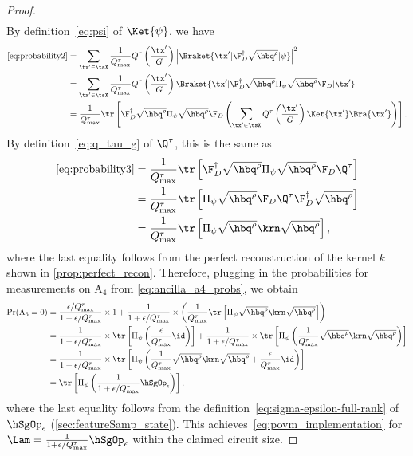 \begin{proof}
\begin{align}
  \end{align}
  By definition~\cref{eq:psi} of $\Ket{\psi}$, we have
  \begin{align}
    \label{eq:probability3}\cref{eq:probability2}&=\sum_{\tx'\in\tsX}\frac{1}{Q_{\max}^{\tau}}Q^{\tau}\left(\frac{\tx'}{G}\right){\left|\Braket{\tx'|\F_{D}^\dag\sqrt{\hbq^{\rho}}|\psi}\right|}^2\nonumber\\
    &=\sum_{\tx'\in\tsX}\frac{1}{Q_{\max}^{\tau}}Q^{\tau}\left(\frac{\tx'}{G}\right)\Braket{\tx'|\F_{D}^\dag\sqrt{\hbq^{\rho}}\Pi_{\psi}\sqrt{\hbq^{\rho}}\F_{D}|\tx'}\nonumber\\
    &=\frac{1}{Q_{\max}^{\tau}}\tr\left[\F_{D}^\dag\sqrt{\hbq^{\rho}}\Pi_{\psi}\sqrt{\hbq^{\rho}}\F_{D}\left(\sum_{\tx'\in\tsX}Q^{\tau}\left(\frac{\tx'}{G}\right)\Ket{\tx'}\Bra{\tx'}\right)\right].
  \end{align}
  By definition~\cref{eq:q_tau_g} of $\Q^{\tau}$, this is the same as
  \begin{align}
    \label{eq:probability4}\cref{eq:probability3}&=\frac{1}{Q_{\max}^{\tau}}\tr\left[\F_{D}^\dag\sqrt{\hbq^{\rho}}\Pi_{\psi}\sqrt{\hbq^{\rho}}\F_{D} \Q^{\tau}\right]\nonumber\\
    &=\frac{1}{Q_{\max}^{\tau}}\tr\left[\Pi_{\psi}\sqrt{\hbq^{\rho}}\F_{D} \Q^{\tau}\F_{D}^\dag\sqrt{\hbq^{\rho}}\right]\nonumber\\
    &=\frac{1}{Q_{\max}^{\tau}}\tr\left[\Pi_{\psi}\sqrt{\hbq^{\rho}}\krn\sqrt{\hbq^{\rho}}\right],
  \end{align}
  where the last equality follows from the perfect reconstruction of the kernel $k$ shown in \cref{prop:perfect_recon}.
  Therefore, plugging in the probabilities for measurements on A$_4$ from \cref{eq:ancilla_a4_probs}, we obtain
  \begin{align}
    \Pr(\text{A}_5=0)&=\frac{\epsilon/Q_{\max}^{\tau}}{1+\epsilon/Q_{\max}^{\tau}}\times 1+\frac{1}{1+\epsilon/Q_{\max}^{\tau}}\times\left(\frac{1}{Q_{\max}^{\tau}}\tr\left[\Pi_{\psi}\sqrt{\hbq^{\rho}}\krn\sqrt{\hbq^{\rho}}\right]\right)\nonumber\\
    &=\frac{1}{1+\epsilon/Q_{\max}^{\tau}}\times \tr\left[\Pi_{\psi}\left(\frac{\epsilon}{Q_{\max}^{\tau}}\id\right)\right]+\frac{1}{1+\epsilon/Q_{\max}^{\tau}}\times\tr\left[\Pi_{\psi}\left(\frac{1}{Q_{\max}^{\tau}}\sqrt{\hbq^{\rho}}\krn\sqrt{\hbq^{\rho}}\right)\right]\nonumber\\
    &=\frac{1}{1+\epsilon/Q_{\max}^{\tau}}\times \tr\left[\Pi_{\psi}\left(\frac{1}{Q_{\max}^{\tau}}\sqrt{\hbq^{\rho}}\krn\sqrt{\hbq^{\rho}}+\frac{\epsilon}{Q_{\max}^{\tau}}\id\right)\right]\nonumber\\
    &=\tr\left[\Pi_{\psi}\left(\frac{1}{1+\epsilon/Q_{\max}^{\tau}}\hSgOp_\epsilon\right)\right],
  \end{align}
  where the last equality follows from the definition~\cref{eq:sigma-epsilon-full-rank} of $\hSgOp_\epsilon$ (\cref{sec:featureSamp_state}).
  This achieves~\cref{eq:povm_implementation} for $\Lam=\frac{1}{1+\epsilon/Q_{\max}^{\tau}}\hSgOp_\epsilon$ within the claimed circuit size.
\end{proof}

